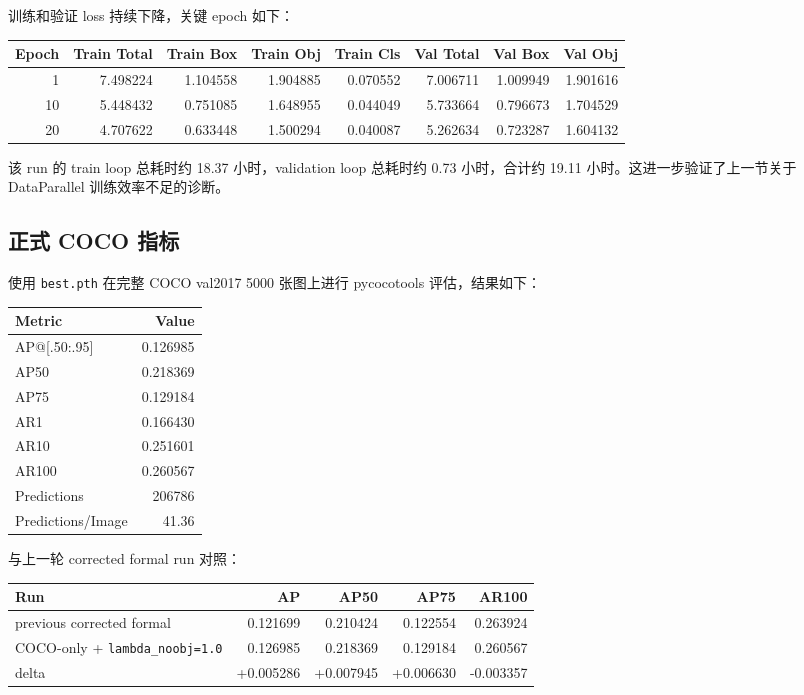 \documentclass[UTF8]{ctexart}
\begin{document}
训练和验证 loss 持续下降，关键 epoch 如下：

\begin{center}
\begin{tabular}{rrrrrrrr}
\toprule
Epoch & Train Total & Train Box & Train Obj & Train Cls & Val Total & Val Box & Val Obj \\
\midrule
1 & 7.498224 & 1.104558 & 1.904885 & 0.070552 & 7.006711 & 1.009949 & 1.901616 \\
10 & 5.448432 & 0.751085 & 1.648955 & 0.044049 & 5.733664 & 0.796673 & 1.704529 \\
20 & 4.707622 & 0.633448 & 1.500294 & 0.040087 & 5.262634 & 0.723287 & 1.604132 \\
\bottomrule
\end{tabular}
\end{center}

该 run 的 train loop 总耗时约 18.37 小时，validation loop 总耗时约 0.73 小时，合计约 19.11 小时。这进一步验证了上一节关于 DataParallel 训练效率不足的诊断。

\subsection{正式 COCO 指标}

使用 \texttt{best.pth} 在完整 COCO val2017 5000 张图上进行 pycocotools 评估，结果如下：

\begin{center}
\begin{tabular}{lr}
\toprule
Metric & Value \\
\midrule
AP@[.50:.95] & 0.126985 \\
AP50 & 0.218369 \\
AP75 & 0.129184 \\
AR1 & 0.166430 \\
AR10 & 0.251601 \\
AR100 & 0.260567 \\
Predictions & 206786 \\
Predictions/Image & 41.36 \\
\bottomrule
\end{tabular}
\end{center}

与上一轮 corrected formal run 对照：

\begin{center}
\begin{tabular}{lrrrr}
\toprule
Run & AP & AP50 & AP75 & AR100 \\
\midrule
previous corrected formal & 0.121699 & 0.210424 & 0.122554 & 0.263924 \\
COCO-only + \texttt{lambda\_noobj=1.0} & 0.126985 & 0.218369 & 0.129184 & 0.260567 \\
delta & +0.005286 & +0.007945 & +0.006630 & -0.003357 \\
\bottomrule
\end{tabular}
\end{center}
\end{document}
